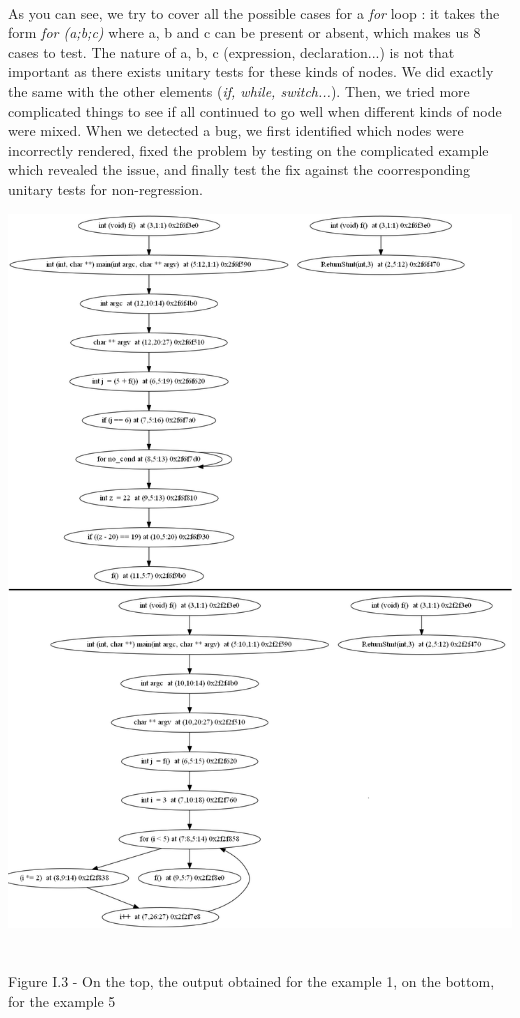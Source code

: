 \documentclass{report}
\begin{document}
\paragraph{}
\hspace{4mm}As you can see, we try to cover all the possible cases for a \textit{for} loop : it takes the form \textit{for (a;b;c)} where a, b and c can be present or absent, which
makes us 8 cases to test. The nature of a, b, c (expression, declaration...) is not that important as there exists unitary tests for these kinds of nodes.
 We did exactly the same with the other elements (\textit{if, while, switch...}).
Then, we tried more complicated things to see if all continued to go well when different kinds of node were mixed. When we detected a bug,
we first identified which nodes were incorrectly rendered, fixed the problem by testing on the complicated example which revealed the issue, and finally
test the fix against the coorresponding unitary tests for non-regression.

\begin{center}
\includegraphics[scale=0.4]{data/for_example}
~\\~\\Figure I.3 - On the top, the output obtained for the example 1, on the bottom, for the example 5
\end{center}
\end{document}
